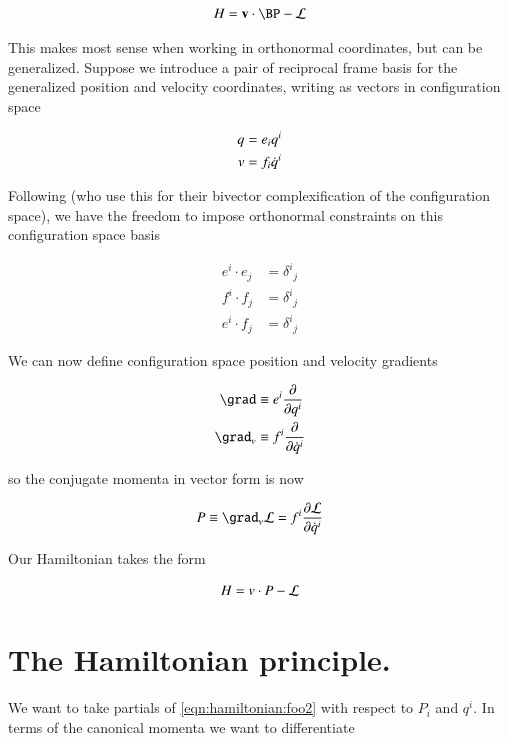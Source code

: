 \begin{align}\label{eqn:hamiltonian:foo3}
H = \Bv \cdot \BP - \LL
\end{align}

This makes most sense when working in orthonormal coordinates, but can be generalized.  Suppose we introduce a pair of reciprocal frame basis for the generalized position and velocity coordinates, writing as vectors in configuration space

\begin{align}\label{eqn:hamiltonian:foo4}
q &= e_i q^i \\
v &= f_i \dot{q}^i 
\end{align}

Following \cite{doran2003gap} (who use this for their bivector complexification of the configuration space), we have the freedom to impose orthonormal constraints on this configuration space basis

\begin{align}\label{eqn:hamiltonian:foo5}
e^i \cdot e_j &= {\delta^i}_j \\
f^i \cdot f_j &= {\delta^i}_j \\
e^i \cdot f_j &= {\delta^i}_j
\end{align}

We can now define configuration space position and velocity gradients

\begin{align}\label{eqn:hamiltonian:foo6}
\grad &\equiv e^i \PD{q^i}{} \\
\grad_v &\equiv f^i \PD{\qdot^i}{}
\end{align}

so the conjugate momenta in vector form is now

\begin{align}\label{eqn:hamiltonian:foo7}
P \equiv \grad_v \LL = f^i \PD{\qdot^i}{\LL}
\end{align}

Our Hamiltonian takes the form

\begin{align}\label{eqn:hamiltonian:foo8}
H = v \cdot P - \mathcal{L}
\end{align}

\section{The Hamiltonian principle.}

We want to take partials of \ref{eqn:hamiltonian:foo2} with respect to $P_i$ and $q^i$.  In terms of the canonical momenta we want to differentiate

